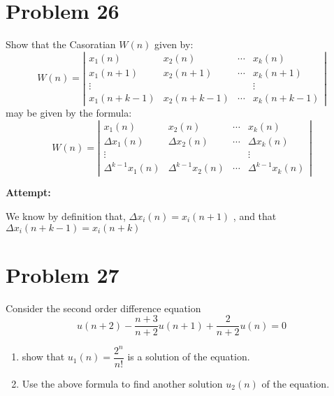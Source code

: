 \documentclass[12pt,letterpaper]{article}
\theoremstyle{definition}
\begin{document}
\section*{Problem 26}

Show that the Casoratian $W(n)$ given by:
\begin{equation}
    W(n) = \left|\begin{matrix}
        x_1(n) & x_2(n) &  \cdots & x_k(n) \\
        x_1(n+1) & x_2(n+1) & \cdots & x_k(n+1)\\
        \vdots & & & \vdots\\
        x_1(n+k-1) & x_2 (n+k-1) & \cdots & x_k(n+k-1)
    \end{matrix}\right|
\end{equation}
may be given by the formula:
\begin{equation*}
    W(n) = \left|\begin{matrix}
        x_1(n) & x_2(n) & \cdots & x_k(n)\\
        \Delta x_1(n) & \Delta x_2(n) & \cdots & \Delta x_k(n)\\
        \vdots & & & \vdots \\
        \Delta^{k-1}x_1(n) & \Delta^{k-1} x_2 (n) & \cdots & \Delta^{k-1} x_k(n)
    \end{matrix}\right|
\end{equation*}



\textbf{Attempt:}
\begin{changemargin}{.5cm}{0cm}

We know by definition that,  $\Delta x_i(n)=x_i(n+1)$ , and that $\Delta x_i(n+k-1)=x_i(n+k)$

\end{changemargin}

\newpage

\section*{Problem 27}

Consider the second order difference equation 
\begin{equation*}
    u(n+2) - \dfrac{n+3}{n+2}u(n+1) + \dfrac{2}{n+2}u(n) = 0
\end{equation*}

\begin{enumerate}[label = (\alph*)]
    \item show that $\displaystyle u_1(n)= \dfrac{2^n}{n!}$ is a solution of the equation.
    \item Use the above formula to find another solution $u_2(n)$ of the equation.
\end{enumerate}
\end{document}
